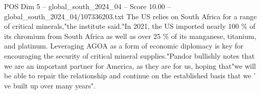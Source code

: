 \begin{textsample}{POS Dim 5 – global\_south\_2024\_04 – Score 10.00 – global\_south\_2024\_04/107336203.txt}
The US relies on South Africa for a range of critical minerals,"the institute said."In 2021, the US imported nearly 100 \% of its chromium from South Africa as well as over 25 \% of its manganese, titanium, and platinum.
Leveraging AGOA as a form of economic diplomacy is key for encouraging the security of critical mineral supplies."Pandor bullishly notes that we are an important partner for America, as they are for us, hoping that"we will be able to repair the relationship and continue on the established basis that we ' ve built up over many years".

\end{textsample}
